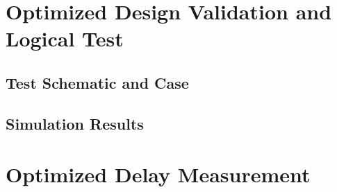 \documentclass[12pt]{article}
\begin{document}
\newpage

\section{Optimized Design Validation and Logical Test}
\subsection{Test Schematic and Case}



\newpage

\subsection{Simulation Results}



\newpage

\section{Optimized Delay Measurement}
\end{document}
